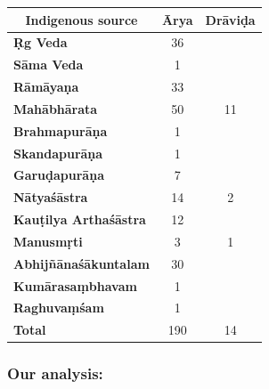\begin{table}[!htbp]
\caption{204 occurences of \textit{Ārya} and \textit{Drāviḍa}\\ from 13 different sources}\label{art3-tab1}
\begin{longtable}{@{}|l|c|c|@{}}
\hline
\multicolumn{1}{|c|}{\textbf{Indigenous source}} & \multicolumn{1}{c|}{\textbf{Ārya}} & \multicolumn{1}{c|}{\textbf{Drāviḍa}} \\
\hline
\textbf{Ṛg Veda} & 36 &  \\
\hline
\textbf{Sāma Veda} & 1 &  \\
\hline
\textbf{Rāmāyaṇa} & 33 &  \\
\hline
\textbf{Mahābhārata} & 50 & 11 \\
\hline
\textbf{Brahmapurāṇa} & 1 &  \\
\hline
\textbf{Skandapurāṇa} & 1 &  \\
\hline
\textbf{Garuḍapurāṇa} & 7 &  \\
\hline
\textbf{Nātyaśāstra} & 14 & 2 \\
\hline
\textbf{Kauṭilya Arthaśāstra} & 12 &  \\
\hline
\textbf{Manusmṛti} & 3 & 1 \\
\hline
\textbf{Abhijñānaśākuntalam} & 30 &  \\
\hline
\textbf{Kumārasaṃbhavam} & 1 &  \\
\hline
\textbf{Raghuvaṃśam} & 1 &  \\
\hline
\textbf{Total} & 190 & 14 \\
\hline
\end{longtable}
\end{table}


\subsubsection{Our analysis:}

